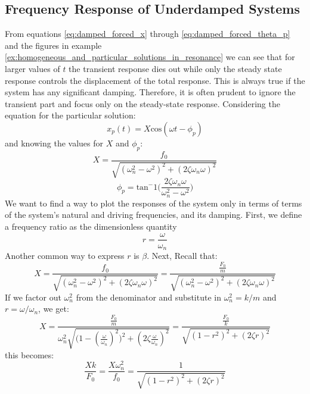 \documentclass[12pt,letter]{article}
\numberwithin{ex}{section} %
\numberwithin{re}{section} %
\begin{document}
		\subsection{Frequency Response of Underdamped Systems}						
			From equations \ref{eq:damped_forced_x} through \ref{eq:damped_forced_theta_p} and the figures in example \ref{ex:homogeneous_and_particular_solutions_in_resonance} we can see that for larger values of $t$ the transient response dies out while only the steady state response controls the displacement of the total response. This is always true if the system has any significant damping. Therefore, it is often prudent to ignore the transient part and focus only on the steady-state response. Considering the equation for the particular solution: 
			\begin{equation}
				x_p(t) = X \text{cos}(\omega t - \phi_p)
			\end{equation}			 
			and knowing the values for $X$ and $\phi_p$: 
			\begin{equation}
				X = \frac{f_0}{\sqrt{(\omega_n^2 - \omega^2)^2 +  (2\zeta \omega_n \omega)^2}} 
			\end{equation}	
			\begin{equation}
				\phi_p = \text{tan}^-1\bigg(\frac{2\zeta \omega_n \omega}{\omega_n^2 - \omega^2}\bigg)
			\end{equation}	
			We want to find a way to plot the responses of the system only in terms of terms of the system's natural and driving frequencies, and its damping. First, we define a frequency ratio as the dimensionless quantity 
			\begin{equation}
				r = \frac{\omega}{\omega_n}
			\end{equation}
			Another common way to express $r$ is $\beta$. Next, Recall that:
			\begin{equation}
				X = \frac{f_0}{\sqrt{(\omega_n^2 - \omega^2)^2 +  (2\zeta \omega_n \omega)^2}}  = \frac{\frac{F_0}{m}}{\sqrt{(\omega_n^2 - \omega^2)^2 +  (2\zeta \omega_n \omega)^2}} 
			\end{equation}				
			If we factor out $\omega_n^2$ from the denominator and substitute in $\omega_n^2 = k/m$ and $r = \omega/\omega_n$, we get:
			\begin{equation}
				X = \frac{\frac{F_0}{m}}{\omega_n^2 \sqrt{\big(1 - (\frac{\omega}{\omega_n})^2\big)^2 +  (2\zeta \frac{\omega}{\omega_n})^2}} =  \frac{\frac{F_0}{k}}{\sqrt{(1-r^2)^2+(2\zeta r)^2}}
			\end{equation}				
			this becomes:
			\begin{equation}
				\frac{Xk}{F_0} = \frac{X \omega_n^2}{f_0} = \frac{1}{\sqrt{(1-r^2)^2+(2\zeta r)^2}}
			\end{equation}				
\end{document}
